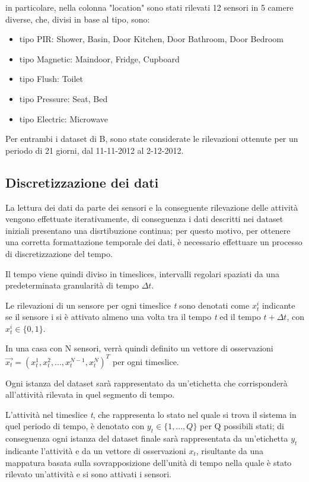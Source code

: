 \documentclass[10pt,a4paper]{article}
\begin{document}
	in particolare, nella colonna "location" sono stati rilevati 12 sensori in 5 camere diverse, che, divisi in base al tipo, sono:

	\begin{itemize}
		\item tipo PIR: Shower, Basin, Door Kitchen, Door Bathroom, Door Bedroom
		\item tipo Magnetic: Maindoor, Fridge, Cupboard
		\item  tipo Flush: Toilet
		\item tipo Pressure: Seat, Bed
		\item tipo Electric: Microwave
	\end{itemize}

	Per entrambi i dataset di B, sono state considerate le rilevazioni ottenute per un periodo di 21 giorni, dal 11-11-2012 al 2-12-2012.

	\subsection{Discretizzazione dei dati}
	La lettura dei dati da parte dei sensori e la conseguente rilevazione delle attività vengono effettuate iterativamente, di conseguenza i dati descritti nei dataset iniziali presentano una disrtibuzione continua; per questo motivo, per ottenere una corretta formattazione temporale dei dati, è necessario effettuare un processo di discretizzazione del tempo.

	Il tempo viene quindi diviso in timeslices, intervalli regolari spaziati da una predeterminata granularità di tempo $ \Delta t $.

	Le rilevazioni di un sensore per ogni timeslice \textit{t} sono denotati come $ x^{i}_{t} $ indicante se il sensore i si è attivato almeno una volta tra il tempo \textit{t} ed il tempo $ t + \Delta t $, con $ x^{i}_{t}  \in  \{0, 1\} $.

	In una casa con N sensori, verrà quindi definito un vettore di osservazioni $ \vec{x_{t}}  = (x^{1}_{t} , x^{2}_{t} , . . . , x^{N-1}_{t} , x^{N}_{t} )^{T} $   per ogni timeslice.

	Ogni istanza del dataset sarà rappresentato da un'etichetta che corrisponderà all'attività rilevata in quel segmento di tempo.

	L'attività nel timeslice \textit{t}, che rappresenta lo stato nel quale si trova il sistema in quel periodo di tempo, è denotato con $ y_{t}  \in  \{1, . . . , Q\} $ per Q possibili stati; di conseguenza ogni istanza del dataset finale sarà rappresentata da un'etichetta $ y_{t} $ indicante l'attività e da un vettore di osservazioni $ x_{t} $, risultante da una mappatura basata sulla sovrapposizione dell'unità di tempo nella quale è stato rilevato un'attività e si sono attivati i sensori.
\end{document}
